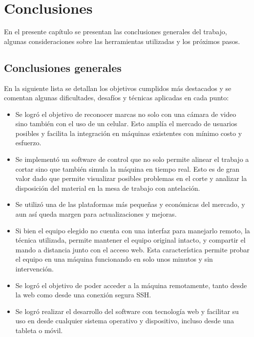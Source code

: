 \chapter{Conclusiones}
\label{Chapter5}
En el presente capítulo se presentan las conclusiones generales del trabajo, algunas consideraciones sobre las herramientas utilizadas y los próximos pasos.

\section{Conclusiones generales }

En la siguiente lista se detallan los objetivos cumplidos más destacados y se comentan algunas dificultades, desafíos y técnicas aplicadas en cada punto:

\begin{itemize}
   \item{Se logró el objetivo de reconocer marcas no solo con una cámara de video sino también con el uso de un celular. Esto amplía el mercado de usuarios posibles y facilita la integración en máquinas existentes con mínimo costo y esfuerzo.}

   \item{Se implementó un software de control que no solo permite alinear el trabajo a cortar sino que también simula la máquina en tiempo real. Esto es de gran valor dado que permite visualizar posibles problemas en el corte y analizar la disposición del material en la mesa de trabajo con antelación.}

   \item{Se utilizó una de las plataformas más pequeñas y económicas del mercado, y aun así queda margen para actualizaciones y mejoras.}

   \item{Si bien el equipo elegido no cuenta con una interfaz para manejarlo remoto, la técnica utilizada, permite mantener el equipo original intacto, y compartir el mando a distancia junto con el acceso web. Esta característica permite probar el equipo en una máquina funcionando en solo unos minutos y sin intervención.}

   \item{Se logró el objetivo de poder acceder a la máquina remotamente, tanto desde la web como desde una conexión segura SSH.}

   \item{Se logró realizar el desarrollo del software con tecnología web y facilitar su uso en desde cualquier sistema operativo y dispositivo, incluso desde una tableta o móvil.}


\end{itemize}

